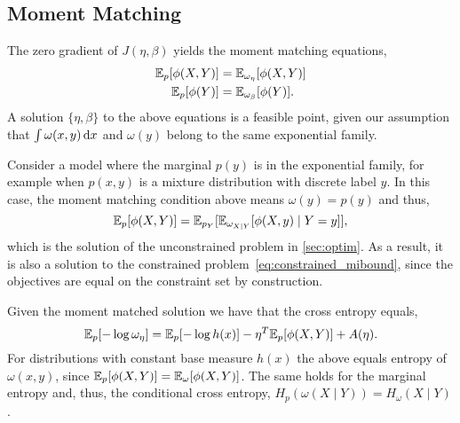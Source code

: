 \subsection{Moment Matching}

The zero gradient of $J(\eta,\beta)$ yields the moment matching
equations, 
\begin{align}
  \mathbb{E}_p[ \phi(X,Y) ] &= \mathbb{E}_{\omega_{\eta}}[ \phi(X,Y)
    ] \label{eq:statcond_joint} \\
  \mathbb{E}_p[ \phi(Y) ] &= \mathbb{E}_{\omega_{\beta}}[ \phi(Y) ]. \label{eq:statcond_marg}
\end{align}
A solution $\{\eta,\beta\}$ to the above equations is a feasible
point, given our assumption that $\int \omega(x,y) \,\mathrm{d} x$ and
$\omega(y)$ belong to the same exponential family.

Consider a model where the marginal $p(y)$ is in the exponential
family, for example when $p(x,y)$ is a mixture distribution with
discrete label $y$.  In this case, the moment matching condition above
means $\omega(y) = p(y)$ and thus,
\begin{equation}
  \mathbb{E}_p[ \phi(X,Y) ] = \mathbb{E}_{p_Y}[ \mathbb{E}_{\omega_{X\mid Y}}[ \phi(X,y)
      \mid Y=y ] ],
\end{equation}
which is the solution of the unconstrained problem in
\SEC\ref{sec:optim}.  As a result, it is also a solution to the
constrained problem~\eqref{eq:constrained_mibound}, since the
objectives are equal on the constraint set by construction.

Given the moment matched solution we have that the cross entropy
equals, 
\[
  \mathbb{E}_p[ - \log \omega_{\eta} ] = \mathbb{E}_p[ - \log h(x) ] - \eta^T \mathbb{E}_p[
    \phi(X,Y) ] + A(\eta).
\]
For distributions with constant base measure $h(x)$ the above equals
entropy of $\omega(x,y)$, since $\mathbb{E}_p[ \phi(X,Y) ] = \mathbb{E}_\omega[
  \phi(X,Y) ]$.  The same holds for the marginal entropy and, thus,
the conditional cross entropy, \mbox{$H_p( \omega(X\mid Y) ) = H_\omega(X
\mid Y)$}.




